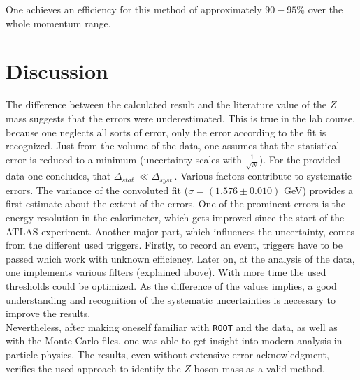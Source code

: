 \documentclass[12pt, a4paper, bibliography=totoc]{scrartcl}
\begin{document}
\begin{multicols}{2}
One achieves an efficiency for this method of approximately $90-95\%$ over the whole momentum range.

\section{Discussion}
The difference between the calculated result and the literature value of the $Z$ mass suggests that the errors were underestimated.
This is true in the lab course, because one neglects all sorts of error, only the error according to the fit is recognized.
Just from the volume of the data, one assumes that the statistical error is reduced to a minimum (uncertainty scales with $\frac{1}{\sqrt{N}}$).
For the provided data one concludes, that $\Delta_{stat.} \ll \Delta_{syst.}$.
Various factors contribute to systematic errors. 
The variance of the convoluted fit ($\sigma = (1.576 \pm 0.010)$ \si{GeV}) provides a first estimate about the extent of the errors.
One of the prominent errors is the energy resolution in the calorimeter, which gets improved since the start of the ATLAS experiment. 
Another major part, which influences the uncertainty, comes from the different used triggers.
Firstly, to record an event, triggers have to be passed which work with unknown efficiency. 
Later on, at the analysis of the data, one implements various filters (explained above).
With more time the used thresholds could be optimized.
As the difference of the values implies, a good understanding and recognition of the systematic uncertainties is necessary to improve the results.\\

Nevertheless, after making oneself familiar with \verb*+ROOT+ and the data, as well as with the Monte Carlo files, one was able to get insight into modern analysis in particle physics. 
The results, even without extensive error acknowledgment, verifies the used approach to identify the $Z$ boson mass as a valid method.  

\newpage
\nocite{*}
\appendix
\printbibliography
\end{multicols}
\end{document}
